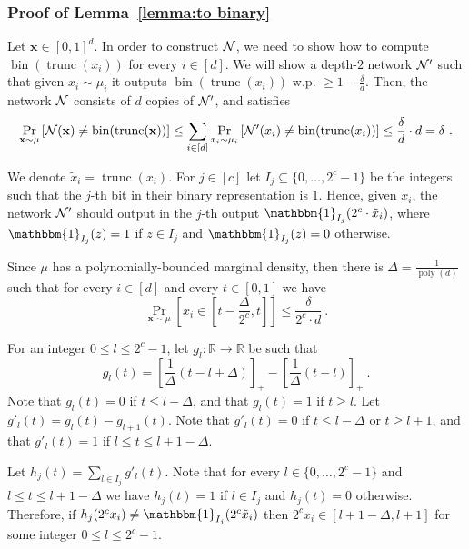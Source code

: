 \documentclass[11pt]{article}
\newcommand{\onefunc}{\mathbbm{1}}
\newcommand{\bx}{\mathbf{x}}
\newcommand{\cn}{{\cal N}}
\newcommand{\reals}{{\mathbb R}}
\DeclareMathOperator{\poly}{poly}
\DeclareMathOperator{\bin}{bin}
\DeclareMathOperator{\trunc}{trunc}
\newcommand{\tx}{{\tilde{x}}}
\begin{document}
\subsubsection{Proof of Lemma~\ref{lemma:to binary}}
\label{sec:proof of lemma to binary}

Let $\bx \in [0,1]^d$.
In order to construct $\cn$, we need to show how to compute $\bin(\trunc(x_i))$ for every $i \in [d]$.
We will show a depth-$2$ network $\cn'$ such that given $x_i \sim \mu_i$ it outputs $\bin(\trunc(x_i))$ w.p. $\geq 1 - \frac{\delta}{d}$. Then, the network $\cn$ consists of $d$ copies of $\cn'$, and satisfies
\[
\Pr_{\bx \sim \mu}\left[\cn(\bx) \neq \bin(\trunc(\bx))\right]
\leq \sum_{i \in [d]} \Pr_{x_i \sim \mu_i}\left[\cn'(x_i) \neq \bin(\trunc(x_i))\right]
\leq \frac{\delta}{d} \cdot d = \delta~.
\]

We denote $\tx_i = \trunc(x_i)$.
For $j \in [c]$ let $I_j \subseteq \{0, \ldots, 2^c - 1\}$ be the integers such that the $j$-th bit in their binary representation is $1$.
Hence, given $x_i$, the network $\cn'$ should output in the $j$-th output $\onefunc_{I_j}(2^c \cdot \tx_i)$,
where $\onefunc_{I_j}(z)=1$ if $z \in I_j$ and $\onefunc_{I_j}(z)=0$ otherwise.

Since $\mu$ has a polynomially-bounded marginal density, then there is $\Delta = \frac{1}{\poly(d)}$ such that for every $i \in [d]$ and every $t \in [0,1]$ we have
\begin{equation}
\label{eq:bounded marginal}
	\Pr_{\bx \sim \mu}\left[x_i \in \left[t-\frac{\Delta}{2^c},t\right] \right] \leq \frac{\delta}{2^c \cdot d}~.
\end{equation}

For an integer $0 \leq l \leq 2^c - 1$, let $g_l:\reals \rightarrow \reals$ be such that
\[
g_l(t) = \left[\frac{1}{\Delta}\left(t-l+\Delta\right)\right]_+ - \left[\frac{1}{\Delta}\left(t-l\right)\right]_+~.
\]
Note that $g_l(t)=0$ if $t \leq l - \Delta$, and that $g_l(t)=1$ if $t \geq l$.
Let $g'_l(t) = g_{l}(t)-g_{l+1}(t)$.
Note that $g'_l(t)=0$ if $t \leq l - \Delta$ or $t \geq l + 1$, and that $g'_l(t)=1$ if $l \leq t \leq l+1-\Delta$.

Let $h_j(t) = \sum_{l \in I_j}g'_l(t)$.
Note that for every $l \in \{0, \ldots, 2^c - 1\}$ and $l \leq t \leq l+1-\Delta$ we have $h_j(t)=1$ if $l \in I_j$ and $h_j(t)=0$ otherwise.
Therefore, if $h_j(2^c x_i) \neq \onefunc_{I_j}(2^c \tx_i)$ then $2^c x_i \in [l + 1-\Delta,l+1]$ for some integer $0 \leq l \leq 2^c-1$.
\end{document}
